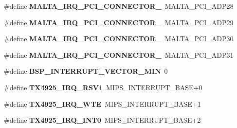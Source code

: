 \begin{DoxyCompactItemize}
\item 
\mbox{\label{group__bsp__interrupt_ga3e41bfcdd669ddfcf81ff43b954e7f81}} 
\#define {\bfseries M\+A\+L\+T\+A\+\_\+\+I\+R\+Q\+\_\+\+P\+C\+I\+\_\+\+C\+O\+N\+N\+E\+C\+T\+O\+R\+\_}~M\+A\+L\+T\+A\+\_\+\+P\+C\+I\+\_\+\+A\+D\+P28
\item 
\mbox{\label{group__bsp__interrupt_gaed24a26e714a49382d65bfee14e4a917}} 
\#define {\bfseries M\+A\+L\+T\+A\+\_\+\+I\+R\+Q\+\_\+\+P\+C\+I\+\_\+\+C\+O\+N\+N\+E\+C\+T\+O\+R\+\_}~M\+A\+L\+T\+A\+\_\+\+P\+C\+I\+\_\+\+A\+D\+P29
\item 
\mbox{\label{group__bsp__interrupt_ga50f1d5fe03823d68d519cdb55c24cc16}} 
\#define {\bfseries M\+A\+L\+T\+A\+\_\+\+I\+R\+Q\+\_\+\+P\+C\+I\+\_\+\+C\+O\+N\+N\+E\+C\+T\+O\+R\+\_}~M\+A\+L\+T\+A\+\_\+\+P\+C\+I\+\_\+\+A\+D\+P30
\item 
\mbox{\label{group__bsp__interrupt_ga29ea36026da446d9b44dcd470f7239e4}} 
\#define {\bfseries M\+A\+L\+T\+A\+\_\+\+I\+R\+Q\+\_\+\+P\+C\+I\+\_\+\+C\+O\+N\+N\+E\+C\+T\+O\+R\+\_}~M\+A\+L\+T\+A\+\_\+\+P\+C\+I\+\_\+\+A\+D\+P31
\item 
\mbox{\label{group__bsp__interrupt_ga64cbb02dfea4d6923abccaa0087d2a0d}} 
\#define {\bfseries B\+S\+P\+\_\+\+I\+N\+T\+E\+R\+R\+U\+P\+T\+\_\+\+V\+E\+C\+T\+O\+R\+\_\+\+M\+IN}~0
\item 
\mbox{\label{group__bsp__interrupt_ga3f9d326b77be7905163ed8a079450d61}} 
\#define {\bfseries T\+X4925\+\_\+\+I\+R\+Q\+\_\+\+R\+S\+V1}~M\+I\+P\+S\+\_\+\+I\+N\+T\+E\+R\+R\+U\+P\+T\+\_\+\+B\+A\+SE+0
\item 
\mbox{\label{group__bsp__interrupt_gafef0490019da97be55b0d5c82b68b98f}} 
\#define {\bfseries T\+X4925\+\_\+\+I\+R\+Q\+\_\+\+W\+TE}~M\+I\+P\+S\+\_\+\+I\+N\+T\+E\+R\+R\+U\+P\+T\+\_\+\+B\+A\+SE+1
\item 
\mbox{\label{group__bsp__interrupt_gac35472d700418626bea6f9f0bc47d4a6}} 
\#define {\bfseries T\+X4925\+\_\+\+I\+R\+Q\+\_\+\+I\+N\+T0}~M\+I\+P\+S\+\_\+\+I\+N\+T\+E\+R\+R\+U\+P\+T\+\_\+\+B\+A\+SE+2
\item 

\end{DoxyCompactItemize}
